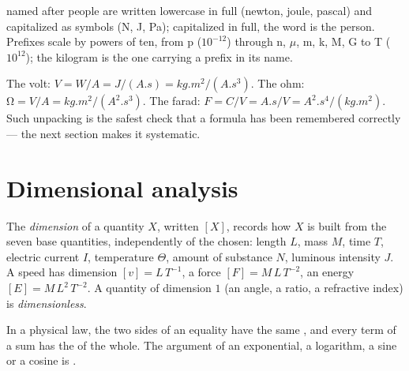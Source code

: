 \begin{remark}\label{rem:b1:units-dimensions:names}
 named after people are written lowercase in full (newton, joule,
pascal) and capitalized as symbols (\unit{N}, \unit{J}, \unit{Pa});
capitalized in full, the word is the person. Prefixes scale by powers of
ten, from p ($10^{-12}$) through n, $\mu$, m, k, M, G to T
($10^{12}$); the
kilogram is the one  carrying a prefix in its name.
\end{remark}

\begin{example}\label{ex:b1:units-dimensions:unpack}
The volt: $\unit{V} = \unit{W/A} = \unit{J/(A.s)} = \unit{kg.m^2/(A.s^3)}$.
The ohm: $\unit{\ohm} = \unit{V/A} = \unit{kg.m^2/(A^2.s^3)}$. The farad:
$\unit{F} = \unit{C/V} = \unit{A.s/V} = \unit{A^2.s^4/(kg.m^2)}$. Such
unpacking is the safest check that a formula has been remembered
correctly --- the next section makes it systematic.
\end{example}

\section{Dimensional analysis}

\begin{definition}[Dimension]\label{def:b1:units-dimensions:dimension}
The \emph{dimension} of a quantity $X$, written $[X]$, records how $X$
is built from the seven base quantities, independently of the 
chosen: length $L$, mass $M$, time $T$, electric current $I$,
temperature $\Theta$, amount of substance $N$, luminous intensity $J$.
A speed has dimension $[v] = L\,T^{-1}$, a force
$[F] = M\,L\,T^{-2}$, an energy $[E] = M\,L^2\,T^{-2}$. A quantity of
dimension $1$ (an angle, a ratio, a refractive index) is
\emph{dimensionless}.
\end{definition}

\begin{theorem}\label{thm:b1:units-dimensions:homogeneity}
In a physical law, the two sides of an equality have the same ,
and every term of a sum has the  of the whole. The argument of
an exponential, a logarithm, a sine or a cosine is .
\end{theorem}

